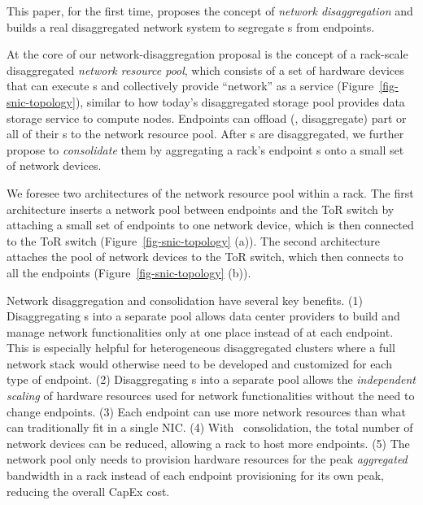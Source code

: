 This paper, for the first time, proposes the concept of {\em network disaggregation} and builds a real disaggregated network system to segregate \nt{}s from endpoints.

At the core of our network-disaggregation proposal is the concept of a rack-scale disaggregated {\em network resource pool}, which consists of a set of hardware devices that can execute \nt{}s and collectively provide ``network'' as a service (Figure~\ref{fig-snic-topology}), similar to how today's disaggregated storage pool provides data storage service to compute nodes. 
Endpoints can offload (\ie, disaggregate) part or all of their \nt{}s to the network resource pool.
After \nt{}s are disaggregated, we further propose to {\em consolidate} them by aggregating a rack's endpoint \nt{}s onto a small set of network devices.

We foresee two architectures of the network resource pool within a rack. The first architecture inserts a network pool between endpoints and the ToR switch by attaching a small set of endpoints to one network device, which is then connected to the ToR switch (Figure~\ref{fig-snic-topology} (a)). The second architecture attaches the pool of network devices to the ToR switch, which then connects to all the endpoints (Figure~\ref{fig-snic-topology} (b)). 

Network disaggregation and consolidation have several key benefits.
(1) Disaggregating \nt{}s into a separate pool allows data center providers to build and manage network functionalities only at one place instead of at each endpoint. 
This is especially helpful for heterogeneous disaggregated clusters where a full network stack would otherwise need to be developed and customized for each type of endpoint.
(2) Disaggregating \nt{}s into a separate pool allows the {\em independent scaling} of hardware resources used for network functionalities without the need to change endpoints.
(3) Each endpoint can use more network resources than what can traditionally fit in a single NIC. 
(4) With \nt\ consolidation, the total number of network devices can be reduced, allowing a rack to host more endpoints.
(5) The network pool only needs to provision hardware resources for the peak \textit{aggregated} bandwidth in a rack instead of each endpoint provisioning for its own peak, reducing the overall CapEx cost.

